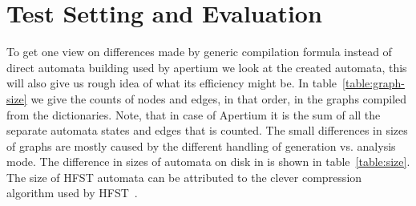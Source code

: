 \documentclass[10pt,a4paper]{article}
\begin{document}
\section{Test Setting and Evaluation}
\label{sec:evaluation}

%

To get one view on differences made by generic compilation formula instead of
direct automata building used by apertium we look at the created automata, this
will also give us rough idea of what its efficiency might be. In
table~\ref{table:graph-size} we give the counts of nodes and edges, in that
order, in the graphs compiled from the dictionaries. Note, that in case
of Apertium it is the sum of all the separate automata states and edges that
is counted. The small differences in sizes of graphs are mostly caused by
the different handling of generation vs. analysis mode. The difference in sizes
of automata on disk in is shown in table~\ref{table:size}.
The size of HFST automata can be attributed to the clever compression
algorithm used by HFST~\cite{silfverberg/2009/fsmnlp}.
\end{document}
